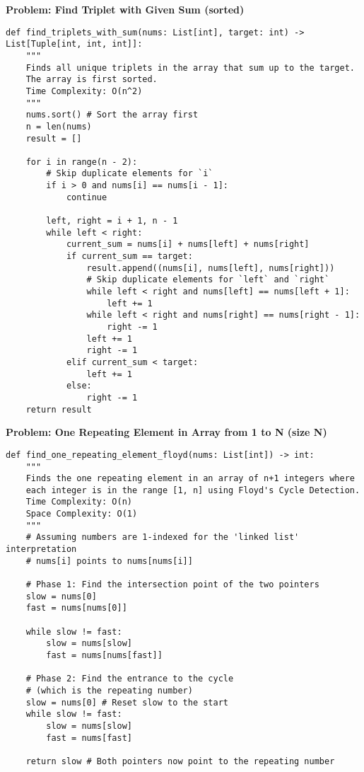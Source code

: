 \noindent\textbf{Problem: Find Triplet with Given Sum (sorted)}
\begin{verbatim}
def find_triplets_with_sum(nums: List[int], target: int) -> List[Tuple[int, int, int]]:
    """
    Finds all unique triplets in the array that sum up to the target.
    The array is first sorted.
    Time Complexity: O(n^2)
    """
    nums.sort() # Sort the array first
    n = len(nums)
    result = []

    for i in range(n - 2):
        # Skip duplicate elements for `i`
        if i > 0 and nums[i] == nums[i - 1]:
            continue

        left, right = i + 1, n - 1
        while left < right:
            current_sum = nums[i] + nums[left] + nums[right]
            if current_sum == target:
                result.append((nums[i], nums[left], nums[right]))
                # Skip duplicate elements for `left` and `right`
                while left < right and nums[left] == nums[left + 1]:
                    left += 1
                while left < right and nums[right] == nums[right - 1]:
                    right -= 1
                left += 1
                right -= 1
            elif current_sum < target:
                left += 1
            else:
                right -= 1
    return result
\end{verbatim}

\noindent\textbf{Problem: One Repeating Element in Array from 1 to N (size N)}
\begin{verbatim}
def find_one_repeating_element_floyd(nums: List[int]) -> int:
    """
    Finds the one repeating element in an array of n+1 integers where
    each integer is in the range [1, n] using Floyd's Cycle Detection.
    Time Complexity: O(n)
    Space Complexity: O(1)
    """
    # Assuming numbers are 1-indexed for the 'linked list' interpretation
    # nums[i] points to nums[nums[i]]
    
    # Phase 1: Find the intersection point of the two pointers
    slow = nums[0]
    fast = nums[nums[0]]

    while slow != fast:
        slow = nums[slow]
        fast = nums[nums[fast]]

    # Phase 2: Find the entrance to the cycle
    # (which is the repeating number)
    slow = nums[0] # Reset slow to the start
    while slow != fast:
        slow = nums[slow]
        fast = nums[fast]
    
    return slow # Both pointers now point to the repeating number
\end{verbatim}

